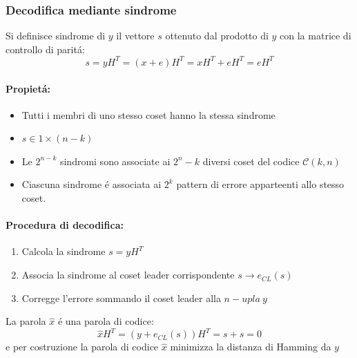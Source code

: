         \subsubsection{Decodifica mediante sindrome}
            Si definisce sindrome di $y$ il vettore $s$ ottenuto dal prodotto di $y$ con la matrice di controllo di paritá:
            \[
                s = yH^T = (x+e)H^T = xH^T+eH^T = eH^T    
            \]
            \paragraph{Propietá:}
                \begin{itemize}
                    \item {
                        Tutti i membri di uno stesso coset hanno la stessa sindrome
                    }
                    \item {
                        $s \in 1 \times (n-k)$
                    }
                    \item {
                        Le $2^{n-k}$ sindromi sono associate ai $2^n-k$ diversi coset del codice $\mathcal{C}(k,n)$
                    }
                    \item {
                        Ciascuna sindrome é associata ai $2^k$ pattern di errore apparteenti allo stesso coset.
                    }
                \end{itemize}
            \paragraph{Procedura di decodifica:}
                \begin{enumerate}
                    \item {Calcola la sindrome $s = yH^T$}
                    \item {Associa la sindrome al coset leader corrispondente $s\rightarrow e_{CL}(s)$}
                    \item {Corregge l'errore sommando il coset leader alla $n-upla\ y$}
                \end{enumerate}
                La parola $\hat{x}$ é una parola di codice:
                \[
                    \hat{x}H^T= (y+e_{CL}(s))H^T = s+s =0   
                \]
                e per costruzione la parola di codice $\hat{x}$ minimizza la distanza di Hamming da $y$

